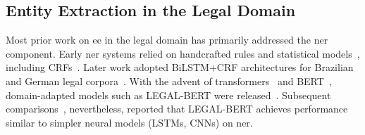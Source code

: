 







\subsection{Entity Extraction in the Legal Domain}
\label{sec:sota:ee:legal}

Most prior work on \acf{ee} in the legal domain has primarily addressed the \acl{ner} component. Early \ac{ner} systems relied on handcrafted rules and statistical models~\cite{ccetindaug2023name_legal_turkish}, including CRFs~\cite{Lafferty2001}. Later work adopted BiLSTM$+$CRF architectures for Brazilian and German legal corpora~\cite{ccetindaug2023name_legal_turkish}. With the advent of transformers~\cite{vaswani_transformers_2017} and BERT~\cite{devlin-etal-2019-bert}, domain-adapted models such as LEGAL-BERT were released~\cite{chalkidis-etal-2020-legal}. Subsequent comparisons~\cite{Keshavarz2022}, nevertheless, reported that LEGAL-BERT achieves performance similar to simpler neural models (LSTMs, CNNs) on \ac{ner}.

